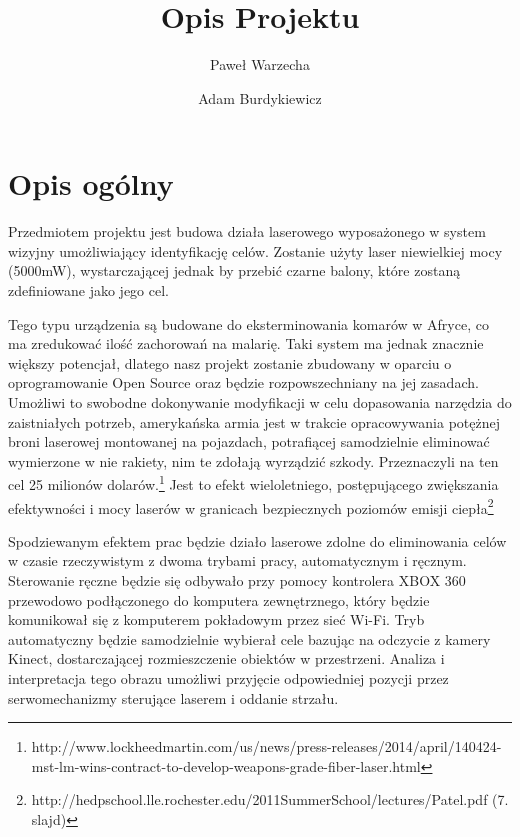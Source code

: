 \documentclass[a4paper, 11pt]{article}
\author{Paweł Warzecha \and Adam Burdykiewicz}
\title{Opis Projektu}
\begin{document}

\maketitle

\newpage
\tableofcontents

\newpage

\section{Opis ogólny}
Przedmiotem projektu jest budowa działa laserowego wyposażonego w system wizyjny umożliwiający identyfikację celów. Zostanie użyty laser niewielkiej mocy (5000mW), wystarczającej jednak by przebić czarne balony, które zostaną zdefiniowane jako jego cel.

Tego typu urządzenia są budowane do eksterminowania komarów w Afryce, co ma zredukować ilość zachorowań na malarię. Taki system ma jednak znacznie większy potencjał, dlatego nasz projekt zostanie zbudowany w oparciu o oprogramowanie Open Source oraz będzie rozpowszechniany na jej zasadach. 
Umożliwi to swobodne dokonywanie modyfikacji w celu dopasowania narzędzia do zaistniałych potrzeb, amerykańska armia jest w trakcie opracowywania potężnej broni laserowej montowanej na pojazdach, potrafiącej samodzielnie eliminować wymierzone w nie rakiety, nim te zdołają wyrządzić szkody. Przeznaczyli na ten cel 25 milionów dolarów.\footnote{http://www.lockheedmartin.com/us/news/press-releases/2014/april/140424-mst-lm-wins-contract-to-develop-weapons-grade-fiber-laser.html} Jest to efekt wieloletniego, postępującego zwiększania efektywności i mocy laserów w granicach bezpiecznych poziomów emisji ciepła\footnote{http://hedpschool.lle.rochester.edu/2011SummerSchool/lectures/Patel.pdf (7. slajd)}

Spodziewanym efektem prac będzie działo laserowe zdolne do eliminowania celów w czasie rzeczywistym z dwoma trybami pracy, automatycznym i ręcznym. 
Sterowanie ręczne będzie się odbywało przy pomocy kontrolera XBOX 360 przewodowo podłączonego do komputera zewnętrznego, który będzie komunikował się z komputerem pokładowym przez sieć Wi-Fi. Tryb automatyczny będzie samodzielnie wybierał cele bazując na odczycie z kamery Kinect, dostarczającej rozmieszczenie obiektów w przestrzeni. Analiza i interpretacja tego obrazu umożliwi przyjęcie odpowiedniej pozycji przez serwomechanizmy sterujące laserem i oddanie strzału.
\end{document}
